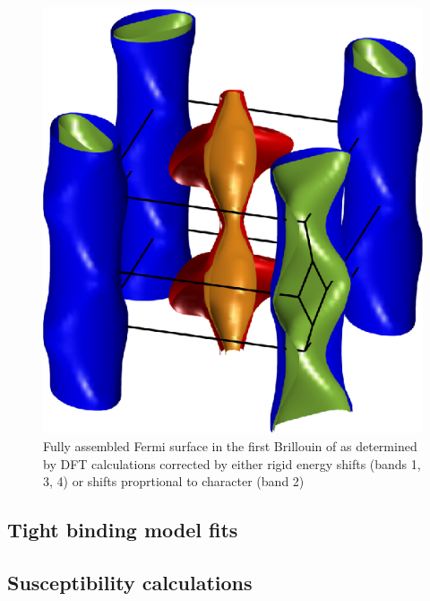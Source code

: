 \begin{figure}[h!]
    \begin{center}
        \includegraphics[scale=0.7]{Chapter3-dHvABaFe2P2/Figures/AngleDepMeasurements/BandCharacterFermiSurface/FullBandCharacterFermiSurface}
        \caption{Fully assembled Fermi surface in the first Brillouin of \BaFeP as determined by DFT calculations corrected by either rigid energy shifts (bands 1, 3, 4) or shifts proprtional to \DzTwo character (band 2)}
        \label{Fig:3:FullBandCharacterFermiSurface}
    \end{center}
\end{figure}


\subsection{Tight binding model fits}


\subsection{Susceptibility calculations}
\label{Sec:SubsceptibilityCalculation}



